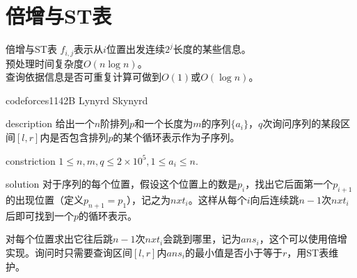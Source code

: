 \documentclass{beamer}
\begin{document}
	\section{倍增与ST表}
	\begin{frame}{倍增与ST表}
		$f_{i,j}$表示从$i$位置出发连续$2^j$长度的某些信息。\\
		
		预处理时间复杂度$O(n\log n)$。\\
		
		查询依据信息是否可重复计算可做到$O(1)$或$O(\log n)$。
	\end{frame}
	\begin{frame}{codeforces1142B Lynyrd Skynyrd}
		\begin{block}{description}
			给出一个$n$阶排列$p$和一个长度为$m$的序列$\{a_i\}$，$q$次询问序列的某段区间$[l,r]$内是否包含排列$p$的某个循环表示作为子序列。
		\end{block}
		\begin{block}{constriction}
			$1 \le n, m, q \le 2\times 10^5, 1 \le a_i \le n.$
		\end{block}
		\pause
		\begin{block}{solution}
			对于序列的每个位置，假设这个位置上的数是$p_i$，找出它后面第一个$p_{i+1}$的出现位置（定义$p_{n+1}=p_1$），记之为$nxt_i$。这样从每个$i$向后连续跳$n-1$次$nxt_i$后即可找到一个$p$的循环表示。
			
			对每个位置求出它往后跳$n-1$次$nxt_i$会跳到哪里，记为$ans_i$，这个可以使用倍增实现。询问时只需要查询区间$[l,r]$内$ans_i$的最小值是否小于等于$r$，用ST表维护。
		\end{block}
	\end{frame}
\end{document}
